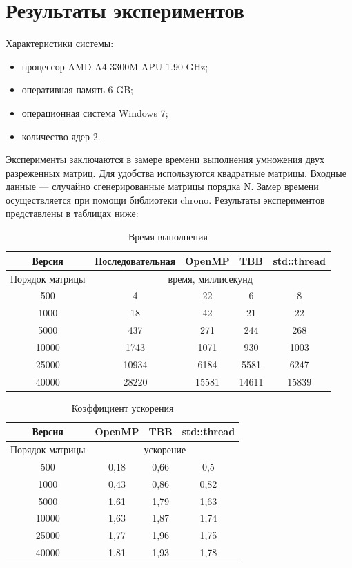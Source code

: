 \documentclass{report}
\begin{document}
\section*{Результаты экспериментов}
\par Характеристики системы:
\begin{itemize}
	\item процессор AMD A4-3300M APU 1.90 GHz;
	\item оперативная память 6 GB;
	\item операционная система Windows 7;
	\item количество ядер 2.
\end{itemize}
\par Эксперименты заключаются в замере времени выполнения умножения двух разреженных матриц. Для удобства используются квадратные матрицы. Входные данные — случайно сгенерированные матрицы порядка N. Замер времени осуществляется при помощи библиотеки chrono. Результаты экспериментов представлены в таблицах ниже:
\begin{table}[htbp]
	\centering
	\begin{tabular}{|c|c|c|c|c|} \hline 
		Версия & Последовательная & OpenMP & TBB & std::thread \\ \hline 
		Порядок матрицы & \multicolumn{4}{|c|}{время, миллисекунд} \\ \hline 
		500 & 4 & 22 & 6 & 8 \\ \hline 
		1000 & 18 & 42 & 21 & 22 \\ \hline 
		5000 & 437 & 271 & 244 & 268 \\ \hline 
		10000 & 1743 & 1071 & 930 & 1003 \\ \hline 
		25000 & 10934 & 6184 & 5581 & 6247 \\ \hline 
		40000 & 28220 & 15581 & 14611 & 15839 \\ \hline 
	\end{tabular}
	\caption{Время выполнения}
\end{table}

\begin{table}[htbp]
	\centering
	\begin{tabular}{|c|c|c|c|} \hline 
		Версия & OpenMP & TBB & std::thread \\ \hline 
		Порядок матрицы & \multicolumn{3}{|c|}{ускорение} \\ \hline 
		500 & 0,18 & 0,66 & 0,5 \\ \hline 
		1000 & 0,43 & 0,86 & 0,82 \\ \hline 
		5000 & 1,61 & 1,79 & 1,63 \\ \hline 
		10000 & 1,63 & 1,87 & 1,74 \\ \hline 
		25000 & 1,77 & 1,96 & 1,75 \\ \hline 
		40000 & 1,81 & 1,93 & 1,78 \\ \hline 
	\end{tabular}
	\caption{Коэффициент ускорения}
\end{table}
\newpage
\end{document}
